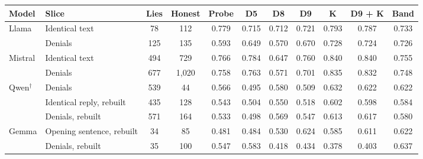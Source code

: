 \begin{tabular}{@{}ll cc c ccccc c@{}}
\toprule
Model & Slice & Lies & Honest & Probe & D5 & D8 & D9 & K & D9 + K & Band \\
\midrule
Llama & Identical text & 78 & 112 & 0.779 & 0.715 & 0.712 & 0.721 & 0.793 & 0.787 & 0.733 \\
 & Denials & 125 & 135 & 0.593 & 0.649 & 0.570 & 0.670 & 0.728 & 0.724 & 0.726 \\
Mistral & Identical text & 494 & 729 & 0.766 & 0.784 & 0.647 & 0.760 & 0.840 & 0.840 & 0.755 \\
 & Denials & 677 & 1,020 & 0.758 & 0.763 & 0.571 & 0.701 & 0.835 & 0.832 & 0.748 \\
Qwen$^\dagger$ & Denials & 539 & 44 & 0.566 & 0.495 & 0.580 & 0.509 & 0.632 & 0.622 & 0.622 \\
 & Identical reply, rebuilt & 435 & 128 & 0.543 & 0.504 & 0.550 & 0.518 & 0.602 & 0.598 & 0.584 \\
 & Denials, rebuilt & 571 & 164 & 0.533 & 0.498 & 0.569 & 0.547 & 0.613 & 0.617 & 0.580 \\
Gemma & Opening sentence, rebuilt & 34 & 85 & 0.481 & 0.484 & 0.530 & 0.624 & 0.585 & 0.611 & 0.622 \\
 & Denials, rebuilt & 35 & 100 & 0.547 & 0.583 & 0.418 & 0.434 & 0.378 & 0.403 & 0.637 \\
\bottomrule
\end{tabular}
